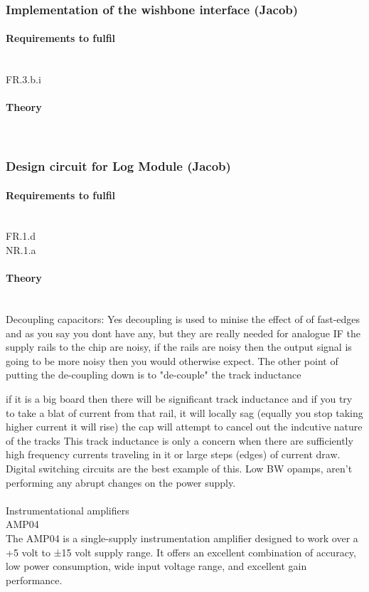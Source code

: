 \subsubsection{Implementation of the wishbone interface (Jacob)} 
\paragraph{Requirements to fulfil}\mbox{}\\
FR.3.b.i\\

\paragraph{Theory}\mbox{}\\


\subsubsection{Design circuit for Log Module (Jacob)}
\paragraph{Requirements to fulfil}\mbox{}\\
FR.1.d\\
NR.1.a
\paragraph{Theory}\mbox{}\\

Decoupling capacitors:
Yes decoupling is used to minise the effect of of fast-edges and as you say you dont have any, but they are really needed for analogue IF the supply rails to the chip are noisy, if the rails are noisy then the output signal is going to be more noisy then you would otherwise expect.
The other point of putting the de-coupling down is to "de-couple" the track inductance 

if it is a big board then there will be significant track inductance and if you try to take a blat of current from that rail, it will locally sag (equally you stop taking higher current it will rise) the cap will attempt to cancel out the indcutive nature of the tracks
This track inductance is only a concern when there are sufficiently high frequency currents traveling in it or large steps (edges) of current draw. Digital switching circuits are the best example of this. Low BW opamps, aren't performing any abrupt changes on the power supply.\\
\\
Instrumentational amplifiers\\
AMP04\\
The AMP04 is a single-supply instrumentation amplifier
designed to work over a +5 volt to ±15 volt supply range. It
offers an excellent combination of accuracy, low power consumption,
wide input voltage range, and excellent gain
performance.


